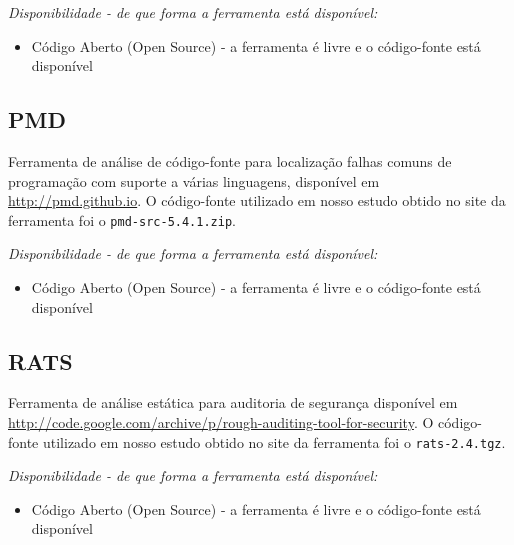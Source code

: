 \begin{description}

  \item {\it Disponibilidade - de que forma a ferramenta está disponível:}
    \begin{itemize}
      \item Código Aberto (Open Source) - a ferramenta é livre e o código-fonte está disponível
    \end{itemize}

\end{description}

\subsection{PMD}

Ferramenta de análise de código-fonte para localização falhas comuns de
programação com suporte a várias linguagens, disponível em
\url{http://pmd.github.io}.  O código-fonte utilizado em nosso estudo obtido
no site da ferramenta foi o \texttt{pmd-src-5.4.1.zip}.

\begin{description}

  \item {\it Disponibilidade - de que forma a ferramenta está disponível:}
    \begin{itemize}
      \item Código Aberto (Open Source) - a ferramenta é livre e o código-fonte está disponível
    \end{itemize}

\end{description}

\subsection{RATS}

Ferramenta de análise estática para auditoria de segurança disponível em
\url{http://code.google.com/archive/p/rough-auditing-tool-for-security}. O
código-fonte utilizado em nosso estudo obtido no site da ferramenta foi o
\texttt{rats-2.4.tgz}.

\begin{description}

  \item {\it Disponibilidade - de que forma a ferramenta está disponível:}
    \begin{itemize}
      \item Código Aberto (Open Source) - a ferramenta é livre e o código-fonte está disponível
    \end{itemize}

\end{description}

